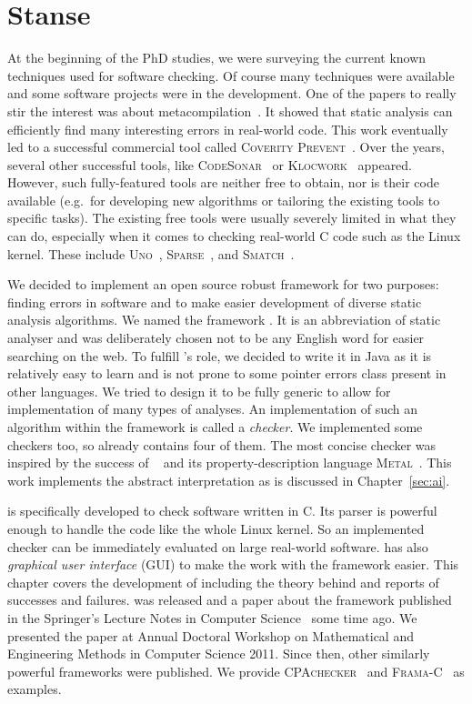 
\chapter{Stanse}\label{sec:stanse}
At the beginning of the PhD studies, we were surveying the current known
techniques used for software checking. Of course many techniques were available
and some software projects were in the development. One of the papers to
really stir the interest was about metacompilation~\cite{metacomp}. It showed
that static analysis can efficiently find many interesting errors in
real-world code. This work eventually led to a successful commercial tool
called \textsc{Coverity Prevent}~\cite{coverity}. Over the years, several
other successful tools, like \textsc{CodeSonar}~\cite{codesonar} or
\textsc{Klocwork}~\cite{klocwork} appeared.  However, such fully-featured
tools are neither free to obtain, nor is their code available (e.g.\ for
developing new algorithms or tailoring the existing tools to specific tasks).
The existing free tools were usually severely limited in what they can do,
especially when it comes to checking real-world C code such as the Linux
kernel. These include \textsc{Uno}~\cite{uno}, \textsc{Sparse}~\cite{sparse},
and \textsc{Smatch}~\cite{smatch}.

We decided to implement an open source robust framework for two purposes:
finding errors in software and to make easier development of diverse static
analysis algorithms. We named the framework \stan. It is an abbreviation of
static analyser and was deliberately chosen not to be any English word for
easier searching on the web. To fulfill \stan's role, we decided to write it in
Java as it is relatively easy to learn and is not prone to some pointer errors
class present in other languages. We tried to design it to be fully generic to
allow for implementation of many types of analyses. An implementation of such
an algorithm within the framework is called a \emph{checker}. We implemented
some checkers too, so \stan already contains four of them. The most concise
checker was inspired by the success of \xgcc~\cite{metacomp} and its
property-description language \textsc{Metal}~\cite{metal}. This work
implements the abstract interpretation as is discussed in
Chapter~\ref{sec:ai}.

\stan is specifically developed to check software written in C. Its parser is
powerful enough to handle the code like the whole Linux kernel. So an
implemented checker can be immediately evaluated on large real-world software.
\stan has also \emph{graphical user interface} (GUI) to make the work with the
framework easier. This chapter covers the development of \stan including the
theory behind and reports of successes and failures. \stan was released and a
paper about the framework published in the Springer's Lecture Notes in
Computer Science~\cite{stanse} some time ago. We presented the paper at Annual
Doctoral Workshop on Mathematical and Engineering Methods in Computer Science
2011.  Since then, other similarly powerful frameworks were published.  We
provide \textsc{CPAchecker}~\cite{cpachecker} and
\textsc{Frama-C}~\cite{framac} as examples.

